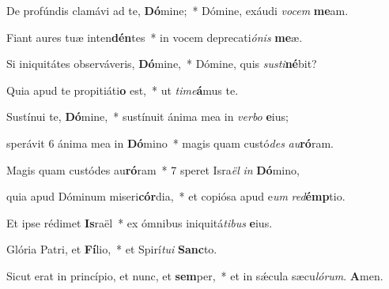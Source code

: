 \item De profúndis clamávi ad te, \textbf{Dó}mine;~* Dómine, exáudi \textit{vocem} \textbf{me}am.

\item Fiant aures tuæ inten\textbf{dén}tes~* in vocem deprecati\textit{ónis} \textbf{me}æ.

\item Si iniquitátes observáveris, \textbf{Dó}mine,~* Dómine, quis \textit{susti}\textbf{né}bit?

\item Quia apud te propitiáti\textbf{o} est,~* ut \textit{time}\textbf{á}mus te.

\item Sustínui te, \textbf{Dó}mine,~* sustínuit ánima mea in \textit{verbo} \textbf{e}ius;

\item sperávit 6 ánima mea in \textbf{Dó}mino~* magis quam custó\textit{des} \textit{au}\textbf{ró}ram.

\item Magis quam custódes au\textbf{ró}ram~* 7 speret Isra\textit{ël} \textit{in} \textbf{Dó}mino,

\item quia apud Dóminum miseri\textbf{cór}dia,~* et copiósa apud e\textit{um} \textit{red}\textbf{émp}tio.

\item Et ipse rédimet \textbf{Is}raël~* ex ómnibus iniquitá\textit{tibus} \textbf{e}ius.

\item Glória Patri, et \textbf{Fí}lio,~* et Spirí\textit{tui} \textbf{Sanc}to.

\item Sicut erat in princípio, et nunc, et \textbf{sem}per,~* et in sǽcula sæcu\textit{lórum}. \textbf{A}men.